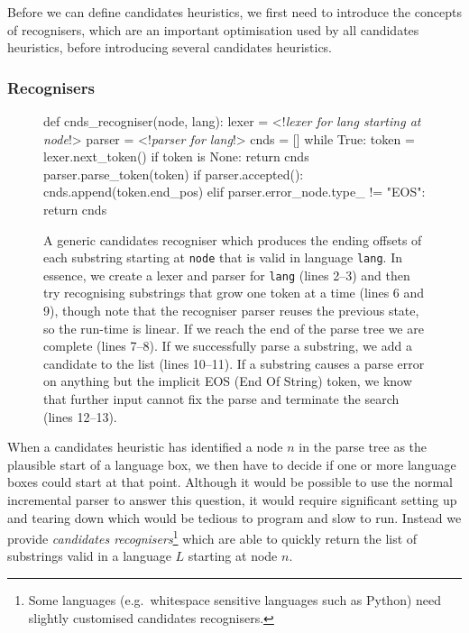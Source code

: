 \documentclass[sigplan,screen]{acmart}\settopmatter{printfolios=true,printccs=false,printacmref=false}
\begin{document}
Before we can define candidates heuristics, we first need to introduce the
concepts of recognisers, which are an important optimisation used by all
candidates heuristics, before introducing several candidates heuristics.


\subsubsection{Recognisers}
\label{sec:recognisers}

\begin{figure}
\begin{lstdefault}[]
def cnds_recogniser(node, lang):
  lexer = <!\textrm{\textit{lexer for lang starting at node}}!>
  parser = <!\textrm{\textit{parser for lang}}!>
  cnds = []
  while True:
    token = lexer.next_token()
    if token is None:
      return cnds
    parser.parse_token(token)
    if parser.accepted():
      cnds.append(token.end_pos)
    elif parser.error_node.type_ != "EOS":
        return cnds
\end{lstdefault}
\caption{A generic candidates recogniser which produces the ending offsets of
  each substring starting at \texttt{node} that is valid in language
  \texttt{lang}. In essence, we create a lexer and parser for \texttt{lang}
  (lines 2--3) and then try recognising substrings that grow one token at a
  time (lines 6 and 9), though note that the recogniser parser reuses the previous
  state, so the run-time is linear. If we reach the end of the parse tree we are complete
  (lines 7--8). If we successfully parse a substring, we add a candidate to the
  list (lines 10--11). If a substring causes a parse error on anything but the
  implicit EOS (End Of String) token, we know that further input cannot fix the parse
    and terminate the search (lines 12--13).}
\label{fig:recogniser}
\end{figure}

When a candidates heuristic has identified a node $n$ in the parse tree as the
plausible start of a language box, we then have to decide if one or more
language boxes could start at that point. Although it would be possible to use
the normal incremental parser to answer this question, it would require
significant setting up and tearing down which would be tedious to program and
slow to run. Instead we provide \emph{candidates recognisers}\footnote{Some languages
  (e.g.~whitespace sensitive languages such as Python) need slightly customised
candidates recognisers.} which are able to quickly return the list of substrings valid in
a language $L$ starting at node $n$.
\end{document}
